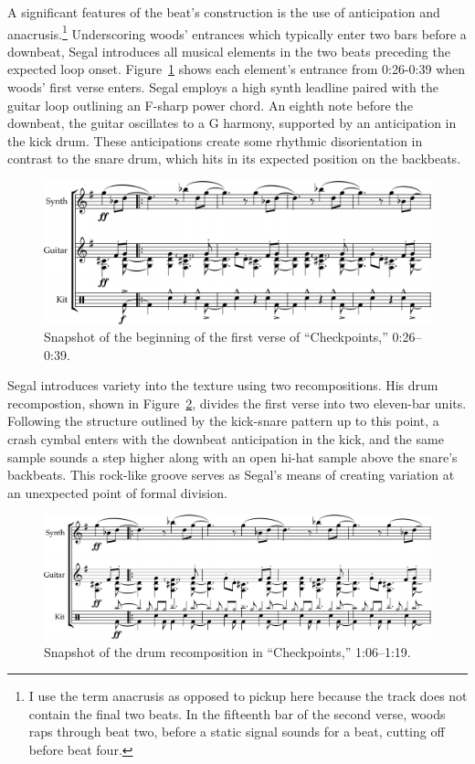 A significant features of the beat's construction is the use of anticipation and anacrusis.\footnote{
    I use the term anacrusis as opposed to pickup here because the track does not contain
    the final two beats. In the fifteenth bar of the second verse, woods raps through beat two,
    before  a static signal sounds for a beat, cutting off before beat four.} 
Underscoring woods' entrances which typically enter two bars before a downbeat, Segal introduces all
musical elements in the two beats preceding the expected loop onset. Figure~\ref{fig:checkpointsintro} 
shows each element's entrance from 0:26-0:39 when woods' first verse enters. Segal employs a high synth
leadline paired with the guitar loop outlining an F-sharp power chord. An eighth note before the downbeat,
the guitar oscillates to a G harmony, supported by an anticipation in the kick drum. These anticipations
create some rhythmic disorientation in contrast to the snare drum, which hits in its expected position
on the backbeats.

    \begin{figure}[ht]
        \centering
        \includegraphics[width=\textwidth]{images/figures/chp 02/026039checkpointsintro.pdf}
        \caption{Snapshot of the beginning of the first verse of ``Checkpoints,'' 0:26--0:39.}
        \label{fig:checkpointsintro}
    \end{figure}

Segal introduces variety into the texture using two recompositions. His drum recompostion, shown 
in Figure~\ref{fig:checkpointsmain}, divides the first verse  into two eleven-bar units. Following
the structure outlined by the kick-snare pattern up to this point, a crash cymbal enters with the 
downbeat anticipation in the kick, and the same sample sounds a step  higher along with an open 
hi-hat sample above the snare's backbeats. This rock-like groove serves as Segal's means of creating
variation at an unexpected point of formal division.

    \begin{figure}[ht]
        \centering
        \includegraphics[width=\textwidth]{images/figures/chp 02/106119checkpointsmain.pdf}
        \caption{Snapshot of the drum recomposition in ``Checkpoints,'' 1:06--1:19.}
        \label{fig:checkpointsmain}
    \end{figure}

